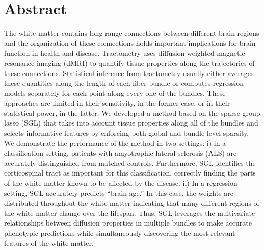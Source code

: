 \documentclass[10pt,letterpaper]{article}
\begin{document}
\section*{Abstract}

The white matter contains long-range connections between different brain
regions and the organization of these connections holds important
implications for brain function in health and disease. Tractometry uses
diffusion-weighted magnetic resonance imaging (dMRI) to quantify tissue
properties along the trajectories of these connections.
Statistical inference from tractometry usually either averages these
quantities along the length of each fiber bundle or computes regression
models separately for each point along every one of the bundles. These
approaches are limited in their sensitivity, in the former case, or in
their statistical power, in the latter. We developed a method based on
the sparse group lasso (SGL)
that takes into account tissue properties along all of the bundles and
selects informative features by enforcing both global and bundle-level
sparsity. We demonstrate the performance of the method in two settings:
i) in a classification setting, patients with amyotrophic lateral
sclerosis (ALS) are accurately distinguished from matched controls.
Furthermore, SGL identifies the corticospinal tract as important for this
classification, correctly finding the parts of the white matter known to
be affected by the disease. ii) In a regression setting, SGL accurately
predicts ``brain age.''
In this case, the weights are distributed throughout the white matter
indicating that many different regions of the white matter change over
the lifespan. Thus, SGL leverages the multivariate relationships between
diffusion properties in multiple bundles to make accurate phenotypic
predictions while simultaneously discovering the most relevant features
of the white matter.

\end{document}
